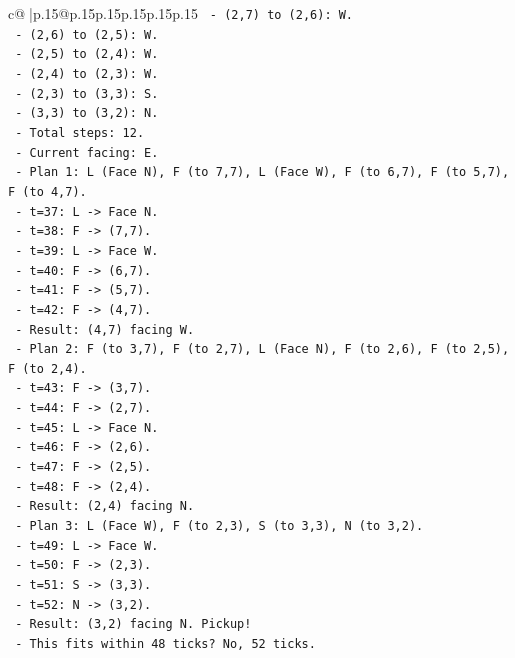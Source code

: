 \documentclass{article}
\begin{document}
{\begin{supertabular}{c@{$\;$}|p{.15\linewidth}@{}p{.15\linewidth}p{.15\linewidth}p{.15\linewidth}p{.15\linewidth}p{.15\linewidth}}
{{{\texttt{    {-} (2,7) to (2,6): W.} \\
\texttt{    {-} (2,6) to (2,5): W.} \\
\texttt{    {-} (2,5) to (2,4): W.} \\
\texttt{    {-} (2,4) to (2,3): W.} \\
\texttt{    {-} (2,3) to (3,3): S.} \\
\texttt{    {-} (3,3) to (3,2): N.} \\
\texttt{  {-} Total steps: 12.} \\
\texttt{  {-} Current facing: E.} \\
\texttt{  {-} Plan 1: L (Face N), F (to 7,7), L (Face W), F (to 6,7), F (to 5,7), F (to 4,7).} \\
\texttt{    {-} t=37: L {-}> Face N.} \\
\texttt{    {-} t=38: F {-}> (7,7).} \\
\texttt{    {-} t=39: L {-}> Face W.} \\
\texttt{    {-} t=40: F {-}> (6,7).} \\
\texttt{    {-} t=41: F {-}> (5,7).} \\
\texttt{    {-} t=42: F {-}> (4,7).} \\
\texttt{    {-} Result: (4,7) facing W.} \\
\texttt{  {-} Plan 2: F (to 3,7), F (to 2,7), L (Face N), F (to 2,6), F (to 2,5), F (to 2,4).} \\
\texttt{    {-} t=43: F {-}> (3,7).} \\
\texttt{    {-} t=44: F {-}> (2,7).} \\
\texttt{    {-} t=45: L {-}> Face N.} \\
\texttt{    {-} t=46: F {-}> (2,6).} \\
\texttt{    {-} t=47: F {-}> (2,5).} \\
\texttt{    {-} t=48: F {-}> (2,4).} \\
\texttt{    {-} Result: (2,4) facing N.} \\
\texttt{  {-} Plan 3: L (Face W), F (to 2,3), S (to 3,3), N (to 3,2).} \\
\texttt{    {-} t=49: L {-}> Face W.} \\
\texttt{    {-} t=50: F {-}> (2,3).} \\
\texttt{    {-} t=51: S {-}> (3,3).} \\
\texttt{    {-} t=52: N {-}> (3,2).} \\
\texttt{    {-} Result: (3,2) facing N. Pickup!} \\
\texttt{  {-} This fits within 48 ticks? No, 52 ticks.} \\
}}}
\end{supertabular}}
\end{document}
